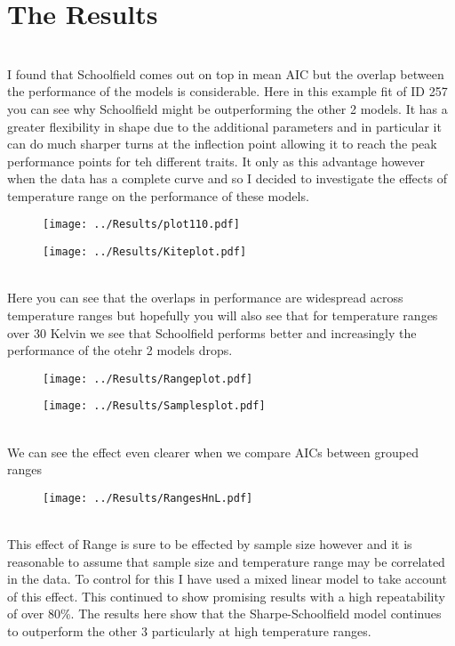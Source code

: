 \documentclass[12pt]{article}
\begin{document}
  \section{The Results}
  \\I found that Schoolfield comes out on top in mean AIC but the overlap between the performance of the models is considerable. Here in this example fit of ID 257 you can see why Schoolfield might be outperforming the other 2 models. It has a greater flexibility in shape due to the additional parameters and in particular it can do much sharper turns at the inflection point allowing it to reach the peak performance points for teh different traits. It only as this advantage however when the data has a complete curve and so I decided to investigate the effects of temperature range on the performance of these models.
  \begin{figure}[h]
    \texttt{[image: ../Results/plot110.pdf]}
  \end{figure}

  \begin{figure}[]
    \texttt{[image: ../Results/Kiteplot.pdf]}
  \end{figure}

  \\Here you can see that the overlaps in performance are widespread across temperature ranges but hopefully you will also see that for temperature ranges over 30 Kelvin we see that Schoolfield performs better and increasingly the performance of the otehr 2 models drops.

  \begin{figure}[]
    \texttt{[image: ../Results/Rangeplot.pdf]}
  \end{figure}

  \begin{figure}[]
    \texttt{[image: ../Results/Samplesplot.pdf]}
  \end{figure}

  \\We can see the effect even clearer when we compare AICs between grouped ranges\:

  \begin{figure}[]
    \texttt{[image: ../Results/RangesHnL.pdf]}
  \end{figure}
  
  \\This effect of Range is sure to be effected by sample size however and it is reasonable to assume that sample size and temperature range may be correlated in the data. To control for this I have used a mixed linear model to take account of this effect. This continued to show promising results with a high repeatability of over 80\%. The results here show that the Sharpe-Schoolfield model continues to outperform the other 3 particularly at high temperature ranges. 
\end{document}
